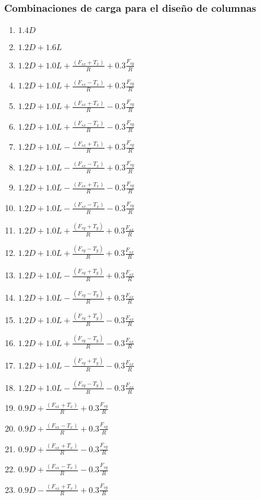 \documentclass[12pt]{article}
\begin{document}
\subsubsection{Combinaciones de carga para el diseño de columnas}
\begin{multicols}{2}
\begin{enumerate}
    \item $1.4D$
    \item $1.2D+1.6L$
    \item $1.2D+1.0L+\frac{(F_{sx}+T_{x})}{R}+0.3\frac{F_{sy}}{R}$
    \item $1.2D+1.0L+\frac{(F_{sx}-T_{x})}{R}+0.3\frac{F_{sy}}{R}$
    \item $1.2D+1.0L+\frac{(F_{sx}+T_{x})}{R}-0.3\frac{F_{sy}}{R}$
    \item $1.2D+1.0L+\frac{(F_{sx}-T_{x})}{R}-0.3\frac{F_{sy}}{R}$
    \item $1.2D+1.0L-\frac{(F_{sx}+T_{x})}{R}+0.3\frac{F_{sy}}{R}$
    \item $1.2D+1.0L-\frac{(F_{sx}-T_{x})}{R}+0.3\frac{F_{sy}}{R}$
    \item $1.2D+1.0L-\frac{(F_{sx}+T_{x})}{R}-0.3\frac{F_{sy}}{R}$
    \item $1.2D+1.0L-\frac{(F_{sx}-T_{x})}{R}-0.3\frac{F_{sy}}{R}$
    \item $1.2D+1.0L+\frac{(F_{sy}+T_{y})}{R}+0.3\frac{F_{sx}}{R}$
    \item $1.2D+1.0L+\frac{(F_{sy}-T_{y})}{R}+0.3\frac{F_{sx}}{R}$
    \item $1.2D+1.0L-\frac{(F_{sy}+T_{y})}{R}+0.3\frac{F_{sx}}{R}$
    \item $1.2D+1.0L-\frac{(F_{sy}-T_{y})}{R}+0.3\frac{F_{sx}}{R}$
    \item $1.2D+1.0L+\frac{(F_{sy}+T_{y})}{R}-0.3\frac{F_{sx}}{R}$
    \item $1.2D+1.0L+\frac{(F_{sy}-T_{y})}{R}-0.3\frac{F_{sx}}{R}$
    \item $1.2D+1.0L-\frac{(F_{sy}+T_{y})}{R}-0.3\frac{F_{sx}}{R}$
    \item $1.2D+1.0L-\frac{(F_{sy}-T_{y})}{R}-0.3\frac{F_{sx}}{R}$
    \item $0.9D+\frac{(F_{sx}+T_{x})}{R}+0.3\frac{F_{sy}}{R}$
    \item $0.9D+\frac{(F_{sx}-T_{x})}{R}+0.3\frac{F_{sy}}{R}$
    \item $0.9D+\frac{(F_{sx}+T_{x})}{R}-0.3\frac{F_{sy}}{R}$
    \item $0.9D+\frac{(F_{sx}-T_{x})}{R}-0.3\frac{F_{sy}}{R}$
    \item $0.9D-\frac{(F_{sx}+T_{x})}{R}+0.3\frac{F_{sy}}{R}$

\end{enumerate}
\end{multicols}
\end{document}
